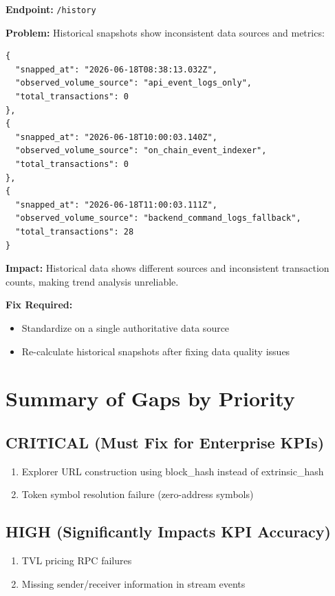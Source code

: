 \documentclass[11pt,a4paper]{article}
\begin{document}
\textbf{Endpoint:} \texttt{/history}

\textbf{Problem:} Historical snapshots show inconsistent data sources and metrics:

\begin{lstlisting}
{
  "snapped_at": "2026-06-18T08:38:13.032Z",
  "observed_volume_source": "api_event_logs_only",
  "total_transactions": 0
},
{
  "snapped_at": "2026-06-18T10:00:03.140Z",
  "observed_volume_source": "on_chain_event_indexer",
  "total_transactions": 0
},
{
  "snapped_at": "2026-06-18T11:00:03.111Z",
  "observed_volume_source": "backend_command_logs_fallback",
  "total_transactions": 28
}
\end{lstlisting}

\textbf{Impact:} Historical data shows different sources and inconsistent transaction counts, making trend analysis unreliable.

\textbf{Fix Required:}
\begin{itemize}
    \item Standardize on a single authoritative data source
    \item Re-calculate historical snapshots after fixing data quality issues
\end{itemize}

\section{Summary of Gaps by Priority}

\subsection{CRITICAL (Must Fix for Enterprise KPIs)}
\begin{enumerate}
    \item Explorer URL construction using block\_hash instead of extrinsic\_hash
    \item Token symbol resolution failure (zero-address symbols)
\end{enumerate}

\subsection{HIGH (Significantly Impacts KPI Accuracy)}
\begin{enumerate}
    \item TVL pricing RPC failures
    \item Missing sender/receiver information in stream events
\end{enumerate}
\end{document}
